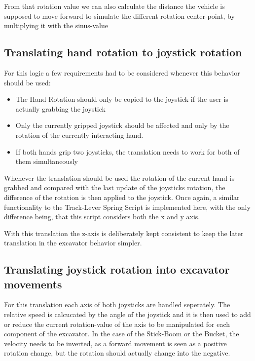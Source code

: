 \documentclass[journal]{vgtc}                     %
\begin{document}
From that rotation value we can also calculate the distance the vehicle is supposed to move forward to simulate the different rotation center-point, by multiplying it with the sinus-value

\subsection{Translating hand rotation to joystick rotation}

For this logic a few requirements had to be considered whenever this behavior should be used:

\begin{itemize}
  \item The Hand Rotation should only be copied to the joystick if the user is actually grabbing the joystick
  \item Only the currently gripped joystick should be affected and only by the rotation of the currently interacting hand.
  \item If both hands grip two joysticks, the translation needs to work for both of them simultaneously
\end{itemize}

Whenever the translation should be used the rotation of the current hand is grabbed and compared with the last update of the joysticks rotation, the difference of the rotation is then applied to the joystick. Once again, a similar functionality to the Track-Lever Spring Script is implemented here, with the only difference being, that this script considers both the x and y axis.

With this translation the z-axis  is deliberately kept consistent to keep the later translation in the excavator behavior simpler.

\subsection{Translating joystick rotation into excavator movements}

For this translation each axis of both joysticks are handled seperately. The relative speed is calcucated by the angle of the joystick and it is then used to add or reduce the current rotation-value of the axis to be manipulated for each component of the excavator. In the case of the Stick-Boom or the Bucket, the velocity needs to be inverted, as a forward movement is seen as a positive rotation change, but the rotation should actually change into the negative.
\end{document}
